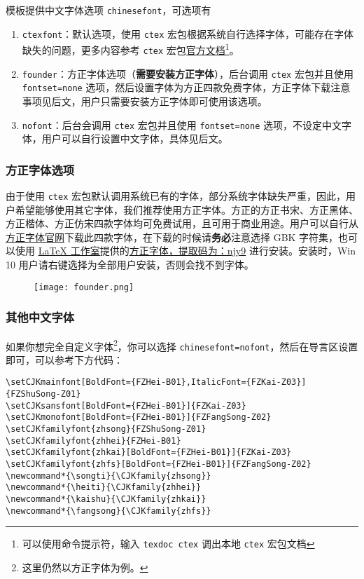 \documentclass[lang=cn,11pt,a4paper]{elegantpaper}
\begin{document}
模板提供中文字体选项 \lstinline{chinesefont}，可选项有
\begin{enumerate}
  \item \lstinline{ctexfont}：默认选项，使用 \lstinline{ctex} 宏包根据系统自行选择字体，可能存在字体缺失的问题，更多内容参考 \lstinline{ctex} 宏包\href{https://ctan.org/pkg/ctex}{官方文档}\footnote{可以使用命令提示符，输入 \lstinline{texdoc ctex} 调出本地 \lstinline{ctex} 宏包文档}。
  \item \lstinline{founder}：方正字体选项（\textbf{需要安装方正字体}），后台调用 \lstinline{ctex} 宏包并且使用 \lstinline{fontset=none} 选项，然后设置字体为方正四款免费字体，方正字体下载注意事项见后文，用户只需要安装方正字体即可使用该选项。
  \item \lstinline{nofont}：后台会调用 \lstinline{ctex} 宏包并且使用 \lstinline{fontset=none} 选项，不设定中文字体，用户可以自行设置中文字体，具体见后文。
\end{enumerate}

\subsubsection{方正字体选项}
由于使用 \lstinline{ctex} 宏包默认调用系统已有的字体，部分系统字体缺失严重，因此，用户希望能够使用其它字体，我们推荐使用方正字体。方正的{\songti 方正书宋}、{\heiti 方正黑体}、{\kaishu 方正楷体}、{\fangsong 方正仿宋}四款字体均可免费试用，且可用于商业用途。用户可以自行从\href{http://www.foundertype.com/}{方正字体官网}下载此四款字体，在下载的时候请\textbf{务必}注意选择 GBK 字符集，也可以使用 \href{https://www.latexstudio.net/}{\LaTeX{} 工作室}提供的\href{https://pan.baidu.com/s/1BgbQM7LoinY7m8yeP25Y7Q}{方正字体，提取码为：njy9} 进行安装。安装时，{\kaishu Win 10 用户请右键选择为全部用户安装，否则会找不到字体。}

\begin{figure}[!htb]
\centering
\texttt{[image: founder.png]}
\end{figure}

\subsubsection{其他中文字体}
如果你想完全自定义字体\footnote{这里仍然以方正字体为例。}，你可以选择 \lstinline{chinesefont=nofont}，然后在导言区设置即可，可以参考下方代码：
\begin{lstlisting}
\setCJKmainfont[BoldFont={FZHei-B01},ItalicFont={FZKai-Z03}]{FZShuSong-Z01}
\setCJKsansfont[BoldFont={FZHei-B01}]{FZKai-Z03}
\setCJKmonofont[BoldFont={FZHei-B01}]{FZFangSong-Z02}
\setCJKfamilyfont{zhsong}{FZShuSong-Z01}
\setCJKfamilyfont{zhhei}{FZHei-B01}
\setCJKfamilyfont{zhkai}[BoldFont={FZHei-B01}]{FZKai-Z03}
\setCJKfamilyfont{zhfs}[BoldFont={FZHei-B01}]{FZFangSong-Z02}
\newcommand*{\songti}{\CJKfamily{zhsong}}
\newcommand*{\heiti}{\CJKfamily{zhhei}}
\newcommand*{\kaishu}{\CJKfamily{zhkai}}
\newcommand*{\fangsong}{\CJKfamily{zhfs}}
\end{lstlisting}
\end{document}

